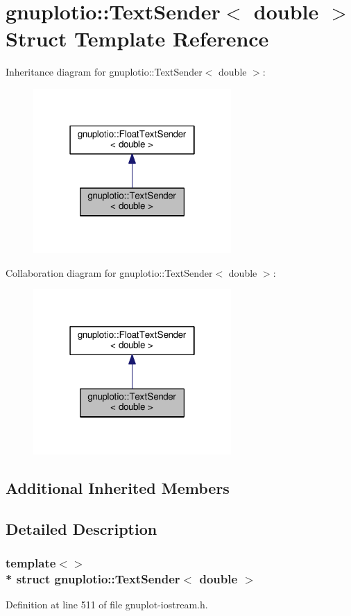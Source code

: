 \hypertarget{structgnuplotio_1_1_text_sender_3_01double_01_4}{}\section{gnuplotio\+:\+:Text\+Sender$<$ double $>$ Struct Template Reference}
\label{structgnuplotio_1_1_text_sender_3_01double_01_4}


Inheritance diagram for gnuplotio\+:\+:Text\+Sender$<$ double $>$\+:\nopagebreak
\begin{figure}[H]
\begin{center}
\leavevmode
\includegraphics[width=214pt]{structgnuplotio_1_1_text_sender_3_01double_01_4__inherit__graph}
\end{center}
\end{figure}


Collaboration diagram for gnuplotio\+:\+:Text\+Sender$<$ double $>$\+:\nopagebreak
\begin{figure}[H]
\begin{center}
\leavevmode
\includegraphics[width=214pt]{structgnuplotio_1_1_text_sender_3_01double_01_4__coll__graph}
\end{center}
\end{figure}
\subsection*{Additional Inherited Members}


\subsection{Detailed Description}
\subsubsection*{template$<$$>$\\*
struct gnuplotio\+::\+Text\+Sender$<$ double $>$}



Definition at line 511 of file gnuplot-\/iostream.\+h.

